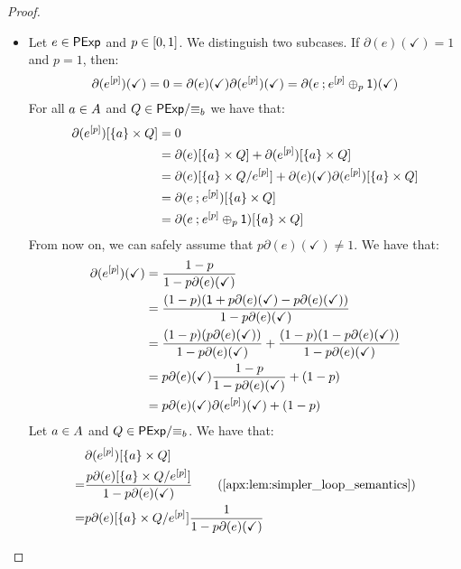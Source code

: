 \begin{proof}
\begin{itemize}[leftmargin=0em]
        \item[]  Let $e \in \mathsf{PExp}$ and $p \in \interval{0}{1}$. We distinguish two subcases. If $\partial(e)(\checkmark)=1$ and $p=1$, then:
        $$
        \partial(e^{[p]})(\checkmark) = 0 = \partial(e)(\checkmark)\partial(e^{[p]})(\checkmark) = \partial(e \mathbin{;} e^{[p]} \oplus_p \mathsf{1})(\checkmark)
        $$
        For all $a \in {A}$ and $Q \in {\mathsf{PExp}}/{\equiv_b}$ we have that:
        \begin{align*}
            \partial(e^{[p]})[\{a\} \times Q] &= 0 \\
            &= \partial(e)[\{a\} \times Q] + \partial(e^{[p]})[\{a\} \times Q] \\
            &= \partial(e)[\{a\} \times Q/{e^{[p]}}] + \partial(e)(\checkmark)\partial(e^{[p]})[\{a\} \times Q]\\
            &= \partial(e \mathbin{;} e^{[p]})[\{a\} \times Q]\\
            &= \partial(e \mathbin{;} e^{[p]} \oplus_p \mathsf{1})[\{a\} \times Q]
        \end{align*}
        From now on, we can safely assume that $p\partial(e)(\checkmark)\neq 1$. We have that:
        \begin{align*}
            \partial(e^{[p]})(\checkmark) &= \frac{1-p}{1-p\partial(e)(\checkmark)}\\
            &=\frac{(1-p)(\mathsf{1} + p\partial(e)(\checkmark) - p\partial(e)(\checkmark))}{1-p\partial(e)(\checkmark)}\\
            &=\frac{(1-p)( p\partial(e)(\checkmark))}{1-p\partial(e)(\checkmark)} + \frac{(1-p)(1-p\partial(e)(\checkmark))}{1-p\partial(e)(\checkmark)}\\
            &= p\partial(e)(\checkmark)\frac{1-p}{1-p\partial(e)(\checkmark)} + (1-p)\\
            &= p\partial(e)(\checkmark)\partial(e^{[p]})(\checkmark) + (1-p)\\	        \end{align*}
        Let $a \in {A}$ and $Q \in {\mathsf{PExp}}/{\equiv_b}$. We have that:
        \begin{align*}
            &\partial(e^{[p]})[\{a\} \times Q]\\
            =& \frac{p\partial(e)[\{a\} \times {Q}/{e^{[p]}}]}{1-p\partial(e)(\checkmark)} \tag{\Cref{apx:lem:simpler_loop_semantics}} \\
            =& p\partial(e)[\{a\} \times {Q}/{e^{[p]}}]\frac{1}{1-p\partial(e)(\checkmark)}\\

\end{align*}
\end{itemize}
\end{proof}
